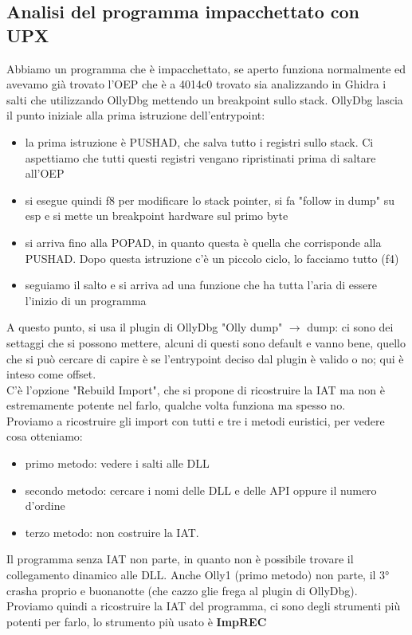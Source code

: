 \documentclass[12pt, oneside]{extbook}
\begin{document}
\subsection{Analisi del programma impacchettato con UPX}
Abbiamo un programma che è impacchettato, se aperto funziona normalmente ed avevamo già trovato l'OEP che è a 4014c0 trovato sia analizzando in Ghidra i salti che utilizzando OllyDbg mettendo un breakpoint sullo stack. OllyDbg lascia il punto iniziale alla prima istruzione dell'entrypoint:
\begin{itemize}
\item la prima istruzione è PUSHAD, che salva tutto i registri sullo stack. Ci aspettiamo che tutti questi registri vengano ripristinati prima di saltare all'OEP
\item si esegue quindi f8 per modificare lo stack pointer, si fa "follow in dump" su esp e si mette un breakpoint hardware sul primo byte
\item si arriva fino alla POPAD, in quanto questa è quella che corrisponde alla PUSHAD. Dopo questa istruzione c'è un piccolo ciclo, lo facciamo tutto (f4)
\item seguiamo il salto e si arriva ad una funzione che ha tutta l'aria di essere l'inizio di un programma
\end{itemize}
A questo punto, si usa il plugin di OllyDbg "Olly dump" $\rightarrow$ dump: ci sono dei settaggi che si possono mettere, alcuni di questi sono default e vanno bene, quello che si può cercare di capire è se l'entrypoint deciso dal plugin è valido o no; qui è inteso come offset.\\C'è l'opzione "Rebuild Import", che si propone di ricostruire la IAT ma non è estremamente potente nel farlo, qualche volta funziona ma spesso no.\\Proviamo a ricostruire gli import con tutti e tre i metodi euristici, per vedere cosa otteniamo:
\begin{itemize}
\item primo metodo: vedere i salti alle DLL
\item secondo metodo: cercare i nomi delle DLL e delle API oppure il numero d'ordine
\item terzo metodo: non costruire la IAT.
\end{itemize}
Il programma senza IAT non parte, in quanto non è possibile trovare il collegamento dinamico alle DLL. Anche Olly1 (primo metodo) non parte, il 3° crasha proprio e buonanotte (che cazzo glie frega al plugin di OllyDbg).\\Proviamo quindi a ricostruire la IAT del programma, ci sono degli strumenti più potenti per farlo, lo strumento più usato è \textbf{ImpREC}
\end{document}
